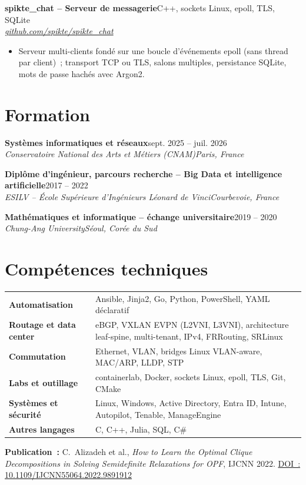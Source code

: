 \documentclass[9pt,a4paper]{extarticle}
\newcommand{\entry}[4]{%
  \textbf{#1}\hfill #2\\[-0.1em]
  \textit{#3}\hfill \textit{#4}\par\vspace{0.1em}}
\begin{document}
\entry{spikte\_chat -- Serveur de messagerie}{C++, sockets Linux, epoll, TLS, SQLite}{}{\href{https://github.com/spikte/spikte_chat}{github.com/spikte/spikte\_chat}}
\begin{itemize}
  \item Serveur multi-clients fondé sur une boucle d'événements epoll (sans thread par client)~; transport TCP ou TLS,
        salons multiples, persistance SQLite, mots de passe hachés avec Argon2.
\end{itemize}

\section{Formation}
\entry{Systèmes informatiques et réseaux}{sept. 2025 -- juil. 2026}{Conservatoire National des Arts et Métiers (CNAM)}{Paris, France}
\entry{Diplôme d'ingénieur, parcours recherche -- Big Data et intelligence artificielle}{2017 -- 2022}{ESILV -- École Supérieure d'Ingénieurs Léonard de Vinci}{Courbevoie, France}
\entry{Mathématiques et informatique -- échange universitaire}{2019 -- 2020}{Chung-Ang University}{Séoul, Corée du Sud}

\section{Compétences techniques}
\begin{tabular}{@{}p{3.3cm}p{13.7cm}@{}}
\textbf{Automatisation} & Ansible, Jinja2, Go, Python, PowerShell, YAML déclaratif \\
\textbf{Routage et data center} & eBGP, VXLAN EVPN (L2VNI, L3VNI), architecture leaf-spine, multi-tenant, IPv4, FRRouting, SRLinux \\
\textbf{Commutation} & Ethernet, VLAN, bridges Linux VLAN-aware, MAC/ARP, LLDP, STP \\
\textbf{Labs et outillage} & containerlab, Docker, sockets Linux, epoll, TLS, Git, CMake \\
\textbf{Systèmes et sécurité} & Linux, Windows, Active Directory, Entra ID, Intune, Autopilot, Tenable, ManageEngine \\
\textbf{Autres langages} & C, C++, Julia, SQL, C\# \\
\end{tabular}

\vspace{0.3em}
{\small\textbf{Publication~:} C.~Alizadeh et al., \textit{How to Learn the Optimal Clique Decompositions in Solving Semidefinite Relaxations for OPF},
IJCNN 2022.
\href{https://ieeexplore.ieee.org/abstract/document/9891912}{DOI~: 10.1109/IJCNN55064.2022.9891912}}
\end{document}
